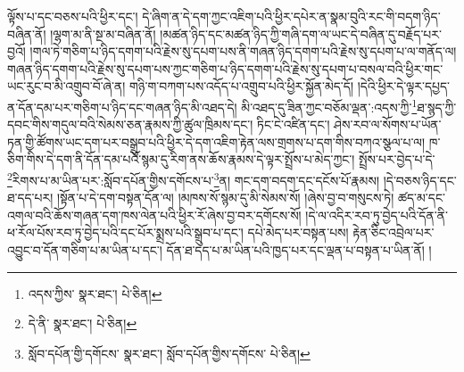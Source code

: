 ལྟོས་པ་དང་བཅས་པའི་ཕྱིར་དང་། དེ་ཞིག་ན་དེ་དག་ཀྱང་འཇིག་པའི་ཕྱིར་དཔེར་ན་སྣམ་བུའི་རང་གི་བདག་ཉིད་བཞིན་ནོ། །ལྷག་མ་ནི་སྔ་མ་བཞིན་ནོ། །མཚན་ཉིད་དང་མཚན་ཉིད་ཀྱི་གཞི་དག་ལ་ཡང་དེ་བཞིན་དུ་བརྗོད་པར་བྱའོ། །གལ་ཏེ་གཅིག་པ་ཉིད་དགག་པའི་རྗེས་སུ་དཔག་པས་ནི་གཞན་ཉིད་དགག་པའི་རྗེས་སུ་དཔག་པ་ལ་གནོད་ལ། གཞན་ཉིད་དགག་པའི་རྗེས་སུ་དཔག་པས་ཀྱང་གཅིག་པ་ཉིད་དགག་པའི་རྗེས་སུ་དཔག་པ་བསལ་བའི་ཕྱིར་གང་ཡང་རུང་བ་མི་འགྲུབ་བོ་ཞེ་ན། གཉི་ག་བཀག་པས་འདོད་པ་འགྲུབ་པའི་ཕྱིར་སྐྱོན་མེད་དོ། །དེའི་ཕྱིར་དེ་ལྟར་དཔྱད་ན་དོན་དམ་པར་གཅིག་པ་ཉིད་དང་གཞན་ཉིད་མི་འཐད་དེ། མི་འཐད་དུ་ཟིན་ཀྱང་བཅོམ་ལྡན་:འདས་ཀྱི་\footnote{འདས་ཀྱིས་  སྣར་ཐང་།  པེ་ཅིན། }ཐ་སྙད་ཀྱི་དབང་གིས་གདུལ་བའི་སེམས་ཅན་རྣམས་ཀྱི་ཚུལ་ཁྲིམས་དང་། ཏིང་ངེ་འཛིན་དང་། ཤེས་རབ་ལ་སོགས་པ་ཡོན་ཏན་གྱི་ཚོགས་ཡང་དག་པར་བསྒྲུབ་པའི་ཕྱིར་དེ་དག་འཇིག་རྟེན་ལས་གྲགས་པ་དག་གིས་བཀའ་སྩལ་པ་ལ། ཁ་ཅིག་གིས་དེ་དག་ནི་དོན་དམ་པའོ་སྙམ་དུ་རིག་ནས་ཆོས་རྣམས་དེ་ལྟར་སྤྲོས་པ་མེད་ཀྱང་། སྤྲོས་པར་བྱེད་པ་དེ་\footnote{དེ་ནི་  སྣར་ཐང་།  པེ་ཅིན། }རིགས་པ་མ་ཡིན་པར་:སློབ་དཔོན་གྱིས་དགོངས་པ་\footnote{སློབ་དཔོན་གྱི་དགོངས་  སྣར་ཐང་། སློབ་དཔོན་གྱིས་དགོངས་  པེ་ཅིན། }ན། གང་དག་བདག་དང་དངོས་པོ་རྣམས། །དེ་བཅས་ཉིད་དང་ཐ་དད་པར། །སྟོན་པ་དེ་དག་བསྟན་དོན་ལ། །མཁས་སོ་སྙམ་དུ་མི་སེམས་སོ། །ཞེས་བྱ་བ་གསུངས་ཏེ། ཚད་མ་དང་འགལ་བའི་ཆོས་གཞན་དག་ཁས་ལེན་པའི་ཕྱིར་རོ་ཞེས་བྱ་བར་དགོངས་སོ། །དེ་ལ་འདིར་རབ་ཏུ་བྱེད་པའི་དོན་ནི་ཕ་རོལ་པོས་རབ་ཏུ་བྱེད་པའི་དང་པོར་སྨྲས་པའི་སྒྲུབ་པ་དང་། དཔེ་མེད་པར་བསྟན་པས། རྟེན་ཅིང་འབྲེལ་པར་འབྱུང་བ་དོན་གཅིག་པ་མ་ཡིན་པ་དང་། དོན་ཐ་དད་པ་མ་ཡིན་པའི་ཁྱད་པར་དང་ལྡན་པ་བསྟན་པ་ཡིན་ནོ། །
